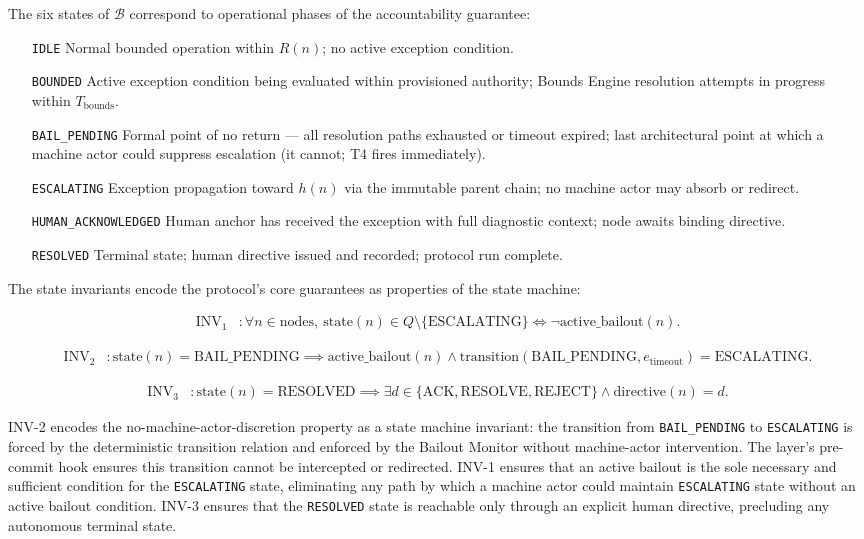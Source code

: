 The six states of $\mathcal{B}$ correspond to operational phases of the accountability guarantee:

\begin{itemize}\itemsep=0pt
\item[\texttt{IDLE}] Normal bounded operation within $R(n)$; no active exception condition.
\item[\texttt{BOUNDED}] Active exception condition being evaluated within provisioned authority; Bounds Engine resolution attempts in progress within $T_{\text{bounds}}$.
\item[\texttt{BAIL\_PENDING}] Formal point of no return — all resolution paths exhausted or timeout expired; last architectural point at which a machine actor could suppress escalation (it cannot; T4 fires immediately).
\item[\texttt{ESCALATING}] Exception propagation toward $h(n)$ via the immutable parent chain; no machine actor may absorb or redirect.
\item[\texttt{HUMAN\_ACKNOWLEDGED}] Human anchor has received the exception with full diagnostic context; node awaits binding directive.
\item[\texttt{RESOLVED}] Terminal state; human directive issued and recorded; protocol run complete.
\end{itemize}

The state invariants encode the protocol's core guarantees as properties of the state machine:

\begin{align}
\text{INV}_1 &: \forall n \in \text{nodes},\ \text{state}(n) \in Q \setminus \{\text{ESCALATING}\} \iff \neg\text{active\_bailout}(n). \tag{BP-INV-1}
\end{align}

\begin{align}
\text{INV}_2 &: \text{state}(n) = \text{BAIL\_PENDING} \implies \text{active\_bailout}(n) \land \text{transition}(\text{BAIL\_PENDING}, e_{\text{timeout}}) = \text{ESCALATING}. \tag{BP-INV-2}
\end{align}

\begin{align}
\text{INV}_3 &: \text{state}(n) = \text{RESOLVED} \implies \exists d \in \{\text{ACK}, \text{RESOLVE}, \text{REJECT}\} \land \text{directive}(n) = d. \tag{BP-INV-3}
\end{align}

INV-2 encodes the no-machine-actor-discretion property as a state machine invariant: the transition from \texttt{BAIL\_PENDING} to \texttt{ESCALATING} is forced by the deterministic transition relation and enforced by the Bailout Monitor without machine-actor intervention. The \fact{} layer's pre-commit hook ensures this transition cannot be intercepted or redirected. INV-1 ensures that an active bailout is the sole necessary and sufficient condition for the \texttt{ESCALATING} state, eliminating any path by which a machine actor could maintain \texttt{ESCALATING} state without an active bailout condition. INV-3 ensures that the \texttt{RESOLVED} state is reachable only through an explicit human directive, precluding any autonomous terminal state.


